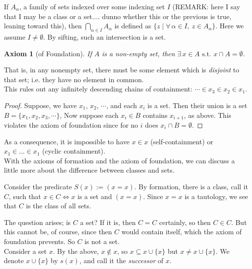 \documentclass[12pt]{report}
\newcommand{\define}{  \noindent{\sc Definition }\hspace{5pt} }
\newcommand{\claim}{ \noindent{\sc Claim }\hspace{5pt} }
\newcommand{\fall}{\forall\,}
\newcommand{\exst}{\exists\,}
\newcommand{\st}{\textrm{ s.t. }}
\newcommand{\intover}[2]{\bigcap_{#1 \in #2}}
\newtheorem{axiom}{Axiom}
\begin{document}
\define If $A_\alpha$, a family of sets indexed over some indexing set $I$ 
(REMARK: here I say that I may be a class or a set.... dunno 
whether this or the previous is true, leaning toward this),
then $\intover{\alpha}{I}A_\alpha$ is defined as $\{z \mid \fall \alpha \in
I,\ z \in A_\alpha\}$. Here we assume $I \neq \emptyset$. By sifting, such an
intersection is a set.

\begin{axiom}[of Foundation]
If $A$ is a non-empty set, then $\exst x \in A \st x \cap A = \emptyset$.
\end{axiom}

That is, in any nonempty set, there must be some element which
is  {\em disjoint} to that set; i.e. they have no element in
common.\\

\claim This rules out any infinitely descending chains of containment: 
$ \cdots \in x_3 \in x_2 \in x_1$.

\begin{proof}
Suppose, we have $x_1$, $x_2$, $\cdots$, and each $x_i$ is a set. Then their
union is a set $B = \{x_1, x_2, x_3, \cdots\}$, Now suppose each $x_i \in B$
contains $x_{i+1}$, as above. This violates the axiom of foundation since for
no $i$ does $x_i \cap B = \emptyset$. 
\end{proof}

As a consequence,  it is impossible to have $x \in x$
(self-containment) or $x_1 \in ... \in x_1$ (cyclic containment).\\

With the axioms of formation and the axiom of foundation, we can discuss a
little more about the difference between classes and sets. 

Consider the predicate $S(x) := (x = x)$. By formation, there is a class, call
it $C$, such that $x \in C \iff x$ is a set and $(x = x)$. Since $x = x$ is a
tautology, we see that $C$ is the class of all sets.

The question arises; is $C$ a set? If it is, then $C = C$ certainly, so then
$C \in C$. But this cannot be, of course, since then $C$ would contain itself,
which the axiom of foundation prevents. So $C$ is not a set.\\

\define {} Consider a set $x$. By the above, $x \not \in x$, so
$x \subseteq x \cup \{x\}$ but $x \neq x \cup \{x\}$. We denote $x \cup \{x\}$
by $s(x)$, and call it the {\em successor} of $x$.\\
\end{document}
